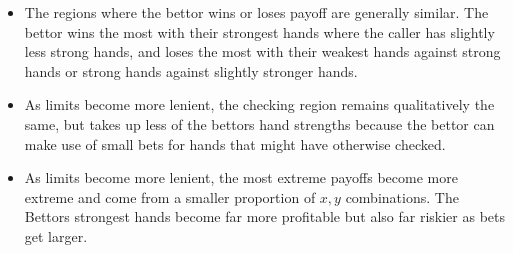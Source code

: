 \documentclass[a4paper,12pt]{article}
\theoremstyle{plain}
\theoremstyle{definition}
\begin{document}
\begin{itemize}
    \item The regions where the bettor wins or loses payoff are generally similar. The bettor wins the most with their strongest hands where the caller has slightly less strong hands, and loses the most with their weakest hands against strong hands or strong hands against slightly stronger hands. 
    \item As limits become more lenient, the checking region remains qualitatively the same, but takes up less of the bettors hand strengths because the bettor can make use of small bets for hands that might have otherwise checked.
    \item As limits become more lenient, the most extreme payoffs become more extreme and come from a smaller proportion of $x, y$ combinations. The Bettors strongest hands become far more profitable but also far riskier as bets get larger.
\end{itemize}
\end{document}
